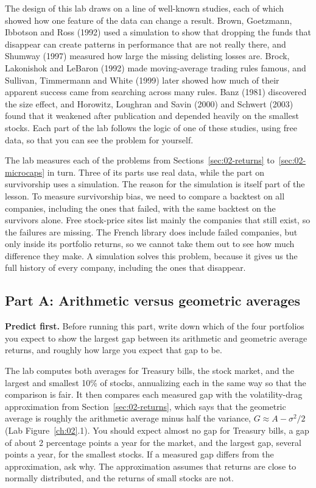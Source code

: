 The design of this lab draws on a line of well-known studies, each of which showed how one feature of the data can change a result. Brown, Goetzmann, Ibbotson and Ross (1992) used a simulation to show that dropping the funds that disappear can create patterns in performance that are not really there, and Shumway (1997) measured how large the missing delisting losses are. Brock, Lakonishok and LeBaron (1992) made moving-average trading rules famous, and Sullivan, Timmermann and White (1999) later showed how much of their apparent success came from searching across many rules. Banz (1981) discovered the size effect, and Horowitz, Loughran and Savin (2000) and Schwert (2003) found that it weakened after publication and depended heavily on the smallest stocks. Each part of the lab follows the logic of one of these studies, using free data, so that you can see the problem for yourself.

The lab measures each of the problems from Sections~\ref{sec:02-returns} to~\ref{sec:02-microcaps} in turn. Three of its parts use real data, while the part on survivorship uses a simulation. 
The reason for the simulation is itself part of the lesson. To measure survivorship bias, we need to compare a backtest on all companies, including the ones that failed, with the same backtest on the survivors alone. Free stock-price sites list mainly the companies that still exist, so the failures are missing. The French library does include failed companies, but only inside its portfolio returns, so we cannot take them out to see how much difference they make. A simulation solves this problem, because it gives us the full history of every company, including the ones that disappear.


\subsection*{Part A: Arithmetic versus geometric averages}

\textbf{Predict first.} Before running this part, write down which of the four portfolios you expect to show the largest gap between its arithmetic and geometric average returns, and roughly how large you expect that gap to be.

The lab computes both averages for Treasury bills, the stock market, and the largest and smallest 10\% of stocks, annualizing each in the same way so that the comparison is fair. It then compares each measured gap with the volatility-drag approximation from Section~\ref{sec:02-returns}, which says that the geometric average is roughly the arithmetic average minus half the variance, $G \approx A - \sigma^2/2$ (Lab Figure~\ref{ch:02}.1). You should expect almost no gap for Treasury bills, a gap of about 2 percentage points a year for the market, and the largest gap, several points a year, for the smallest stocks. If a measured gap differs from the approximation, ask why. The approximation assumes that returns are close to normally distributed, and the returns of small stocks are not.

